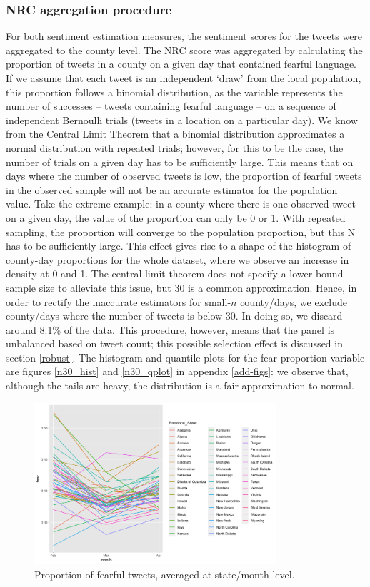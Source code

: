 \documentclass{article}
\begin{document}
\subsubsection{NRC aggregation procedure}\label{aggregation}
For both sentiment estimation measures, the sentiment scores for the tweets were aggregated to the county level. The NRC score was aggregated by calculating the proportion of tweets in a county on a given day that contained fearful language. If we assume that each tweet is an independent `draw' from the local population, this proportion follows a  binomial distribution, as the variable represents the number of successes -- tweets containing fearful language -- on a sequence of independent Bernoulli trials (tweets in a location on a particular day). We know from the Central Limit Theorem that a binomial distribution approximates a normal distribution with repeated trials; however, for this to be the case, the number of trials on a given day has to be sufficiently large. This means that on days  where the number of observed tweets is low, the proportion of fearful tweets in the observed sample will not be an accurate estimator for the population value. Take the extreme example: in a county where there is one observed tweet on a given day, the value of the proportion can only be 0 or 1. With repeated sampling, the proportion will converge to the population proportion, but this N has to be sufficiently large. This effect gives rise to a shape of the histogram of county-day proportions for the whole dataset, where we observe an increase in density at 0 and 1. The central limit theorem does not specify a lower bound sample size to alleviate this issue, but 30 is a common approximation. Hence, in order to rectify the inaccurate estimators for small-\(n\) county/days, we exclude county/days where the number of tweets is below 30. In doing so, we discard around 8.1\% of the data. This procedure, however, means that the panel is unbalanced based on tweet count; this possible selection effect is discussed in section \ref{robust}. The histogram and quantile plots for the fear proportion variable are figures \ref{n30_hist} and \ref{n30_qplot} in appendix \ref{add-figs}: we observe that, although the tails are heavy, the distribution is a fair approximation to normal.

\begin{figure}[h!]
  \includegraphics[width=0.8\textwidth]{figs/sent_time.png}    
  \centering
  \caption{Proportion of fearful tweets, averaged at state/month level.}
  \label{sent_time}
\end{figure}
\end{document}
